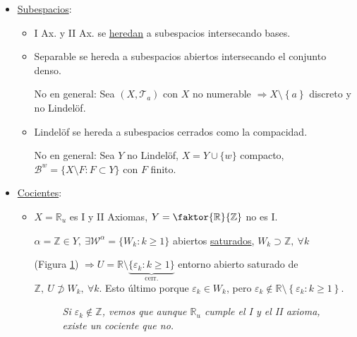 \begin{demo}
\begin{itemize}
    \item \underline{Subespacios}:
    \begin{itemize}
        \item I Ax. y II Ax. se \underline{heredan} a subespacios intersecando bases.
        \item Separable se hereda a subespacios abiertos intersecando el conjunto denso.

        No en general: Sea $\left( X, \mathcal{T}_a \right)$ con $X$ no numerable $\Rightarrow X \setminus \left\{ a \right\}$ discreto y no Lindelöf.
        \item Lindelöf se hereda a subespacios cerrados como la compacidad. 

        No en general: Sea $Y$ no Lindelöf, $X = Y \cup \{w\}$ compacto, $\mathcal{B}^w = \{X \setminus F: F \subset Y\}$ con $F$ finito.    
    \end{itemize}

    \item \underline{Cocientes}:
    \begin{itemize}
        \item $X = \mathbb{R}_u$ es I y II Axiomas, $Y = \faktor{\mathbb{R}}{\mathbb{Z}}$ no es I.
        \begin{demo}
            $\alpha = \mathbb{Z} \in Y,\ \exists \mathcal{W}^{\alpha} = \{W_k : k \ge 1\}$ abiertos \underline{saturados}, $W_k \supset \mathbb{Z},\ \forall k$

            (Figura \ref{fig:I_ax_II_ax_cocientes}) $\Rightarrow U = \mathbb{R} \setminus \underbrace{\{\varepsilon_k : k \ge 1\}}_{\text{cerr.}}$ entorno abierto saturado de $\mathbb{Z},\ U \not \supset W_k,\ \forall k$. Esto último porque $\varepsilon_k \in W_k$, pero $\varepsilon_k \not\in \mathbb{R} \setminus \left\{ \varepsilon_k : k \ge 1 \right\}$.

        \begin{figure}[H]
            \centering
            \caption{\textit{Si $\varepsilon_k \not\in \mathbb{Z}$, vemos que aunque $\mathbb{R}_u$ cumple el I y el II axioma, existe un cociente que no.}}
            \label{fig:I_ax_II_ax_cocientes}
        \end{figure}
        \end{demo}


\end{itemize}
\end{itemize}
\end{demo}
